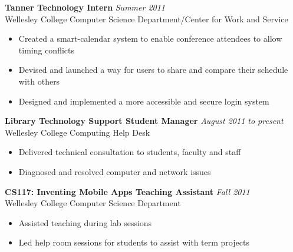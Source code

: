 \documentclass[margin,line]{resume}
\begin{document}
\begin{resume}
	\textbf{Tanner Technology Intern} \hfill \textsl{Summer 2011}\vspace{1mm}\\%
	Wellesley College Computer Science Department/Center for Work and Service\vspace{0mm}\\\vspace{-2mm}%
	\begin{itemize}
	\item Created a smart-calendar system to enable conference attendees to allow timing conflicts
	\item Devised and launched a way for users to share and compare their schedule with others
	\item Designed and implemented a more accessible and secure login system
	\end{itemize}
	
	\textbf{Library Technology Support Student Manager} \hfill \textsl{August 2011 to present}\vspace{1mm}\\%
	Wellesley College Computing Help Desk\vspace{0mm}\\\vspace{-2mm}%
	\begin{itemize}
	\item Delivered technical consultation to students, faculty and staff
	\item Diagnosed and resolved computer and network issues
	\end{itemize}
	
	\textbf{CS117: Inventing Mobile Apps Teaching Assistant} \hfill \textsl{Fall 2011}\vspace{1mm}\\%
	Wellesley College Computer Science Department\vspace{0mm}\\\vspace{-2mm}%
	\begin{itemize}
	\item Assisted teaching during lab sessions
	\item Led help room sessions for students to assist with term projects
	\end{itemize}
	
\end{resume}
\end{document}
